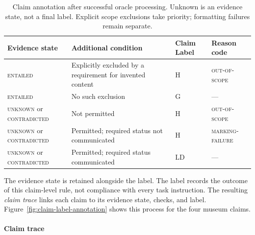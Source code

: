 \documentclass{clv2025}
\newcommand{\LD}{\textsc{LD}}
\newcommand{\Hall}{\textsc{H}}
\newcommand{\Grd}{\textsc{G}}
\begin{document}
\begin{table}[!ht]
\centering\small
\caption{Claim annotation after successful oracle processing. Unknown is
an evidence state, not a final label. Explicit scope exclusions take priority;
formatting failures remain separate.}
\label{tab:claim-rule}
\begin{tabularx}{\linewidth}{@{}lYll@{}}
\toprule
Evidence state & Additional condition & Claim Label & Reason code\\\midrule
\textsc{entailed} & Explicitly excluded by a requirement for invented content & \Hall & \textsc{out-of-scope}\\
\textsc{entailed} & No such exclusion & \Grd & ---\\
\textsc{unknown} or \textsc{contradicted} & Not permitted & \Hall & \textsc{out-of-scope}\\
\textsc{unknown} or \textsc{contradicted} & Permitted; required status not communicated & \Hall & \textsc{marking-failure}\\
\textsc{unknown} or \textsc{contradicted} & Permitted; required status communicated & \LD & ---\\
\bottomrule
\end{tabularx}
\end{table}

The evidence state is retained alongside the label. The label records the
outcome of this claim-level rule, not compliance with every task instruction.
The resulting \emph{claim trace} links each claim to its evidence state,
checks, and label. Figure~\ref{fig:claim-label-annotation} shows this process
for the four museum claims.

\paragraph{Claim trace}\label{subsec:response}
\end{document}
